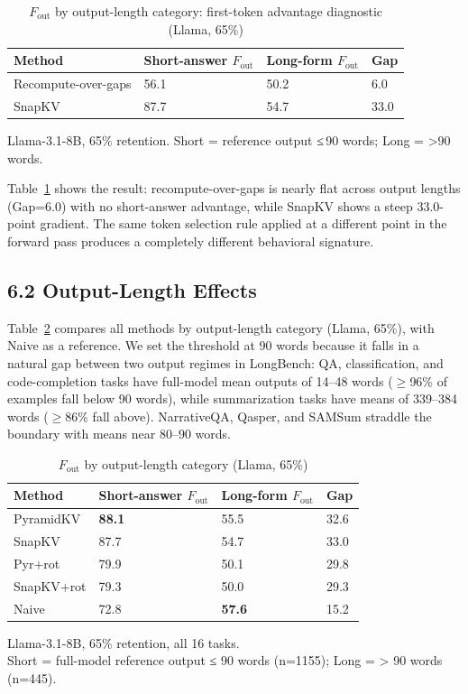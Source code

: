 \documentclass[10pt,letterpaper]{article}
\begin{document}
\begin{table}[H]
\centering
\small
\caption{\(F_{\text{out}}\) by output-length category: first-token advantage diagnostic (Llama, 65\%)}
\label{tab:rog}
\begin{tabular}{@{}llll@{}}
\toprule
Method & Short-answer \(F_{\text{out}}\) & Long-form \(F_{\text{out}}\) & Gap\\
\midrule
Recompute-over-gaps & 56.1 & 50.2 & 6.0\\
SnapKV              & 87.7 & 54.7 & 33.0\\
\bottomrule
\end{tabular}

\center Llama-3.1-8B, 65\% retention. Short = reference output ≤\,90 words; Long = \textgreater{}90 words.
\end{table}

Table~\ref{tab:rog} shows
the result: recompute-over-gaps is nearly flat across output lengths
(Gap=6.0) with no short-answer advantage, while SnapKV shows a steep
33.0-point gradient. The same token selection rule applied at a
different point in the forward pass produces a completely different
behavioral signature.

\hypertarget{output-length-effects}{%
\subsection{6.2 Output-Length Effects}\label{output-length-effects}}

Table~\ref{tab:t5} compares all methods by output-length category (Llama, 65\%),
with Naive as a reference. We set the threshold at 90 words because it
falls in a natural gap between two output regimes in LongBench: QA,
classification, and code-completion tasks have full-model mean outputs
of 14--48 words ($\geq$96\% of examples fall below 90 words), while
summarization tasks have means of 339--384 words ($\geq$86\% fall above).
NarrativeQA, Qasper, and SAMSum straddle the boundary with means near
80--90 words.
\begin{table}[H]
\centering
\small
\caption{\(F_{\text{out}}\) by output-length category (Llama, 65\%)}
\label{tab:t5}
\begin{tabular}{@{}llll@{}}
\toprule
Method & Short-answer \(F_{\text{out}}\) & Long-form \(F_{\text{out}}\)
& Gap\\
\midrule
PyramidKV & \textbf{88.1} & 55.5 & 32.6\\
SnapKV & 87.7 & 54.7 & 33.0\\
Pyr+rot & 79.9 & 50.1 & 29.8\\
SnapKV+rot & 79.3 & 50.0 & 29.3\\
Naive & 72.8 & \textbf{57.6} & 15.2\\
\bottomrule
\end{tabular}

\center Llama-3.1-8B, 65\% retention, all 16 tasks.
\\Short = full-model reference output ≤ 90 words (n=1155); Long =
\textgreater{} 90 words (n=445).
\end{table}
\end{document}
